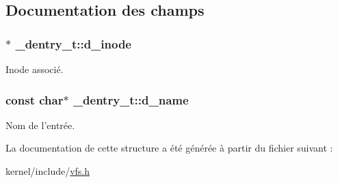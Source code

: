 \subsection{Documentation des champs}
\hypertarget{struct__dentry__t_ac711731a0c08b35b5d2731b8545c7454}{
\subsubsection[{d\-\_\-inode}]{$\ast$ \-\_\-dentry\-\_\-t\-::d\-\_\-inode}}\label{struct__dentry__t_ac711731a0c08b35b5d2731b8545c7454}
Inode associé. \hypertarget{struct__dentry__t_ac9b991f6f5d5c5ce60e8d256d667265e}{
\subsubsection[{d\-\_\-name}]{\setlength{\rightskip}{0pt plus 5cm}const char$\ast$ \-\_\-dentry\-\_\-t\-::d\-\_\-name}}\label{struct__dentry__t_ac9b991f6f5d5c5ce60e8d256d667265e}
Nom de l'entrée. 

La documentation de cette structure a été générée à partir du fichier suivant \-:\begin{DoxyCompactItemize}
\item 
kernel/include/\hyperlink{vfs_8h}{vfs.\-h}\end{DoxyCompactItemize}
